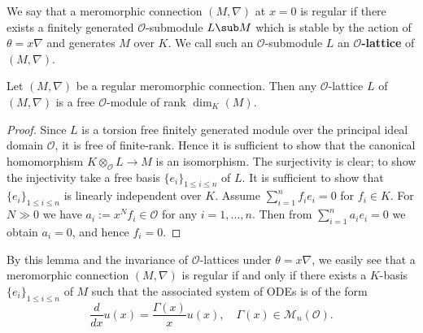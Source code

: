 We say that a meromorphic connection $(M,\nabla)$ at $x=0$ is regular if there exists a finitely generated $\mathscr{O}$-submodule $L\sub M$ which is stable by the action of $\theta=x\nabla$ and generates $M$ over $K$. We call such an $\mathscr{O}$-submodule $L$ an \textbf{$\mathscr{O}$-lattice} of $(M,\nabla)$.

\begin{lemma}\label{D-module regular meromorphic connection O-lattice free}
Let $(M,\nabla)$ be a regular meromorphic connection. Then any $\mathscr{O}$-lattice $L$ of $(M,\nabla)$ is a free $\mathscr{O}$-module of rank $\dim_K(M)$.
\end{lemma}
\begin{proof}
Since $L$ is a torsion free finitely generated module over the principal ideal domain $\mathscr{O}$, it is free of finite-rank. Hence it is sufficient to show that the canonical homomorphism $K\otimes_\mathscr{O}L\to M$ is an isomorphism. The surjectivity is clear; to show the injectivity take a free basis $\{e_i\}_{1\leq i\leq n}$ of $L$. It is sufficient to show that $\{e_i\}_{1\leq i\leq n}$ is linearly independent over $K$. Assume $\sum_{i=1}^{n}f_ie_i=0$ for $f_i\in K$. For $N\gg 0$ we have $a_i:=x^Nf_i\in\mathscr{O}$ for any $i=1,\dots,n$. Then from $\sum_{i=1}^{n}a_ie_i=0$ we obtain $a_i=0$, and hence $f_i=0$.
\end{proof}

By this lemma and the invariance of $\mathscr{O}$-lattices under $\theta=x\nabla$, we easily see that a meromorphic connection $(M,\nabla)$ is regular if and only if there exists a $K$-basis $\{e_i\}_{1\leq i\leq n}$ of $M$ such that the associated system of ODEs is of the form
\[\frac{d}{dx}u(x)=\frac{\Gamma(x)}{x}u(x),\quad \Gamma(x)\in\mathcal{M}_n(\mathscr{O}).\]

